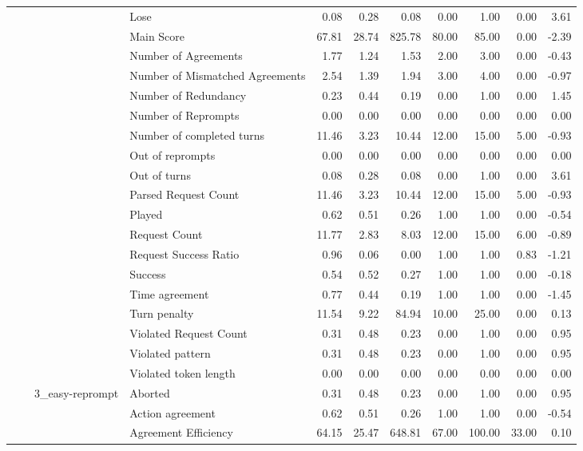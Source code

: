 \begin{tabular}{llllrrrrrrr}
 &  &  & Lose & 0.08 & 0.28 & 0.08 & 0.00 & 1.00 & 0.00 & 3.61 \\
 &  &  & Main Score & 67.81 & 28.74 & 825.78 & 80.00 & 85.00 & 0.00 & -2.39 \\
 &  &  & Number of Agreements & 1.77 & 1.24 & 1.53 & 2.00 & 3.00 & 0.00 & -0.43 \\
 &  &  & Number of Mismatched Agreements & 2.54 & 1.39 & 1.94 & 3.00 & 4.00 & 0.00 & -0.97 \\
 &  &  & Number of Redundancy & 0.23 & 0.44 & 0.19 & 0.00 & 1.00 & 0.00 & 1.45 \\
 &  &  & Number of Reprompts & 0.00 & 0.00 & 0.00 & 0.00 & 0.00 & 0.00 & 0.00 \\
 &  &  & Number of completed turns & 11.46 & 3.23 & 10.44 & 12.00 & 15.00 & 5.00 & -0.93 \\
 &  &  & Out of reprompts & 0.00 & 0.00 & 0.00 & 0.00 & 0.00 & 0.00 & 0.00 \\
 &  &  & Out of turns & 0.08 & 0.28 & 0.08 & 0.00 & 1.00 & 0.00 & 3.61 \\
 &  &  & Parsed Request Count & 11.46 & 3.23 & 10.44 & 12.00 & 15.00 & 5.00 & -0.93 \\
 &  &  & Played & 0.62 & 0.51 & 0.26 & 1.00 & 1.00 & 0.00 & -0.54 \\
 &  &  & Request Count & 11.77 & 2.83 & 8.03 & 12.00 & 15.00 & 6.00 & -0.89 \\
 &  &  & Request Success Ratio & 0.96 & 0.06 & 0.00 & 1.00 & 1.00 & 0.83 & -1.21 \\
 &  &  & Success & 0.54 & 0.52 & 0.27 & 1.00 & 1.00 & 0.00 & -0.18 \\
 &  &  & Time agreement & 0.77 & 0.44 & 0.19 & 1.00 & 1.00 & 0.00 & -1.45 \\
 &  &  & Turn penalty & 11.54 & 9.22 & 84.94 & 10.00 & 25.00 & 0.00 & 0.13 \\
 &  &  & Violated Request Count & 0.31 & 0.48 & 0.23 & 0.00 & 1.00 & 0.00 & 0.95 \\
 &  &  & Violated pattern & 0.31 & 0.48 & 0.23 & 0.00 & 1.00 & 0.00 & 0.95 \\
 &  &  & Violated token length & 0.00 & 0.00 & 0.00 & 0.00 & 0.00 & 0.00 & 0.00 \\
\cline{3-11}
 &  & \multirow[t]{27}{*}{3_easy-reprompt} & Aborted & 0.31 & 0.48 & 0.23 & 0.00 & 1.00 & 0.00 & 0.95 \\
 &  &  & Action agreement & 0.62 & 0.51 & 0.26 & 1.00 & 1.00 & 0.00 & -0.54 \\
 &  &  & Agreement Efficiency & 64.15 & 25.47 & 648.81 & 67.00 & 100.00 & 33.00 & 0.10 \\

\end{tabular}
